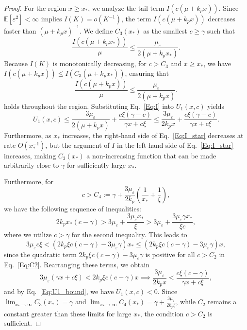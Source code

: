 \documentclass[11pt]{article}
\theoremstyle{definition}
\begin{document}
\begin{proof}
	For the region $x \ge x_*$, we analyze the tail term $I(c(\mu + k_p x))$. Since $\mathbb{E}[\varepsilon^2] < \infty$ implies $I(K) = o(K^{-1})$, the term $I(c(\mu + k_p x))$ decreases faster than $(\mu + k_p x)^{-1}$. We define $C_3(x_*)$ as the smallest $c \ge \gamma$ such that 
	\begin{equation}
		\frac{I(c(\mu + k_p x_*))}{\mu} \le \frac{\mu_{\varepsilon}}{2(\mu + k_p x_*)}.  \label{Eq:I_star}
	\end{equation}
	Because $I(K)$ is monotonically decreasing, for $c > C_3$ and $x \ge x_*$, we have $I(c(\mu+k_px)) \le I(C_3(\mu+k_px_*))$, ensuring that
	\begin{equation}
		\frac{I(c(\mu + k_p x))}{\mu} \le \frac{\mu_{\varepsilon}}{2(\mu + k_p x)}. \label{Eq:I}
	\end{equation}
	holds throughout the region. 
	Substituting Eq.~\eqref{Eq:I} into $U_1(x, c)$ yields
	\begin{equation}
		U_1(x,c) \le  \frac{3 \mu_{\varepsilon}}{2(\mu + k_p x)} + \frac{c\xi(\gamma - c)}{\gamma x + c \xi} \le \frac{3\mu_{\varepsilon}}{2 k_p x} + \frac{c\xi(\gamma - c)}{\gamma x + c \xi}. \label{Eq:U1_bound}
	\end{equation}
	Furthermore, as $x_*$ increases, the right-hand side of Eq.~\eqref{Eq:I_star} decreases at rate $O(x_*^{-1})$, but the argument of $I$ in the left-hand side of Eq.~\eqref{Eq:I_star} increases, 
	making $C_3(x_*)$ a non-increasing function that can be made arbitrarily close to $\gamma$ for sufficiently large $x_*$.
	
	Furthermore, for
	\[
	c > C_4 := \gamma + \frac{3 \mu_{\varepsilon}}{2 k_p} \left( \frac{1}{x_*} + \frac{1}{\xi} \right),
	\]
	we have the following sequence of inequalities:
	\[
	2 k_p x_* (c - \gamma) > 3 \mu_{\varepsilon} + \frac{3 \mu_{\varepsilon} x_*}{\xi} > 3 \mu_{\varepsilon} + \frac{3 \mu_{\varepsilon} \gamma x_*}{\xi c},
	\]
	where we utilize $c > \gamma$ for the second inequality. This leads to
	\[
	3 \mu_{\varepsilon} c \xi < (2 k_p \xi c (c - \gamma) - 3 \mu_{\varepsilon} \gamma) x_* \le (2 k_p \xi c (c - \gamma) - 3 \mu_{\varepsilon} \gamma) x,
	\]
	since the quadratic term $2 k_p \xi c (c - \gamma) - 3 \mu_{\varepsilon} \gamma$ is positive for all $c > C_2$ in Eq.~\eqref{Eq:C2}. 
	Rearranging these terms, we obtain
	\[
	3 \mu_{\varepsilon} (\gamma x + c \xi) < 2 k_p \xi c (c - \gamma) x \implies \frac{3 \mu_{\varepsilon}}{2 k_p x} < \frac{c \xi (c - \gamma)}{\gamma x + c \xi},
	\]
	and by Eq.~\eqref{Eq:U1_bound}, we have $U_1(x, c) < 0$. 
	Since $\lim_{x_* \to \infty} C_3(x_*) = \gamma$ and $\lim_{x_* \to \infty} C_4(x_*) = \gamma + \frac{3\mu_\varepsilon}{2k_p\xi}$, while $C_2$ remains a constant greater than these limits for large $x_*$, the condition $c > C_2$ is sufficient.
	

\end{proof}
\end{document}
